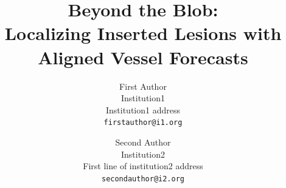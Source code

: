 \documentclass[10pt,twocolumn,letterpaper]{article}
\title{Beyond the Blob:\\Localizing Inserted Lesions with Aligned Vessel Forecasts}
\author{First Author\\
Institution1\\
Institution1 address\\
{\tt\small firstauthor@i1.org}
\and
Second Author\\
Institution2\\
First line of institution2 address\\
{\tt\small secondauthor@i2.org}
}
\begin{document}

{
    \small
    
    
}
\end{document}
